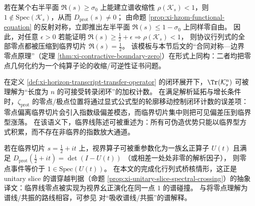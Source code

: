 \begin{remark}\label{rem:xi-hzom-contraction-template}
若在某个右半平面 \(\Re(s)\ge \sigma_0\) 上能建立谱收缩性 \(\rho(\mathcal{K}_s)<1\)，则 \(1\notin\mathrm{Spec}(\mathcal{K}_s)\)，从而 \(D_{\mathrm{prot}}(s)\neq 0\)；
由命题 \ref{prop:xi-hzom-functional-equation} 的反射对称，立即推出左半平面 \(\Re(s)\le 1-\sigma_0\) 上同样零自由。
因此，对任意 \(\epsilon>0\) 若能证明
\(
\Re(s)\ge \tfrac12+\epsilon\Rightarrow \rho(\mathcal{K}_s)<1
\)，
则协议行列式的全部零点都被压缩到临界切片 \(\Re(s)=\tfrac12\)。
该模板与本节后文的“合同对称—边界零点原理”（定理 \ref{thm:xi-contractive-boundary-zero}）在形式上同构：二者均把零点几何化约为一个纯算子论的收缩/可逆性证书问题。
\end{remark}

\begin{remark}\label{rem:xi-hzom-zero-soundness-duality}
在定义 \ref{def:xi-horizon-transcript-transfer-operator} 的闭环展开下，\(\Tr(\mathcal{K}_s^n)\) 可被理解为“长度为 \(n\) 的可接受转录闭环”的加权计数。
在满足解析延拓与增长条件时，\(\zeta_{\mathrm{prot}}\) 的零点/极点位置将通过显式公式型的轮廓移动控制闭环计数的误差项：零点偏离临界切片会引入指数级偏差模态，而临界切片集中则把可见偏差压到临界型涨落。
在该语义下，临界线陈述可被重述为：所有可伪造优势只能以临界型方式积累，而不存在非临界的指数放大通道。
\end{remark}

\begin{corollary}\label{cor:xi-hzom-unitary-slice}
若在临界切片 \(s=\tfrac12+it\) 上，视界算子可被重参数化为一族幺正算子 \(U(t)\) 且满足
\(
D_{\mathrm{prot}}(\tfrac12+it)=\det(I-U(t))
\)
（或相差一处处非零的解析因子），
则零点事件等价于 \(1\in\mathrm{Spec}(U(t))\)。
在本文的完成化行列式桥核情形，这正是 unitary slice 的谱穿越判据（命题 \ref{prop:xi-unitary-slice-spectral-crossing}）的抽象译文：临界线零点被实现为视界幺正演化在同一点 \(1\) 的谱碰撞。
与将零点理解为谱线/共振的路线相容，可参见 \cite{Connes1999TraceFormulaNCG} 对“吸收谱线/共振”的谱解释。
\end{corollary}

